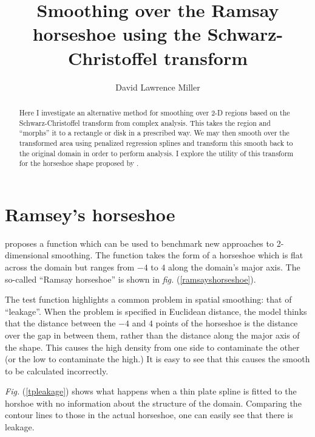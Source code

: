 \documentclass[a4paper,10pt]{amsart}
\title{Smoothing over the Ramsay horseshoe using the Schwarz-Christoffel transform}
\author{David Lawrence Miller}
\newcommand{\fig}[1]{\emph{fig.} (\ref{#1})}
\newcommand{\Fig}[1]{\emph{Fig.} (\ref{#1})}
\begin{document}
\begin{abstract}
Here I investigate an alternative method for smoothing over 2-D regions based on the Schwarz-Christoffel transform from complex analysis. This takes the region and ``morphs'' it to a rectangle or disk in a prescribed way. We may then smooth over the transformed area using penalized regression splines and transform this smooth back to the original domain in order to perform analysis. I explore the utility of this transform for the horseshoe shape proposed by \cite{ramsay}.
\end{abstract}


\newtheorem{thm}{Theorem}[section]

\newtheorem{defn}{Definition}[section]

\maketitle



\section{Ramsey's horseshoe}

\cite{ramsay} proposes a function which can be used to benchmark new approaches to 2-dimensional smoothing. The function takes the form of a horseshoe which is flat across the domain but ranges from $-4$ to $4$ along the domain's major axis. The so-called ``Ramsay horseshoe'' is shown in \fig{ramsayshorseshoe}.

The test function highlights a common problem in spatial smoothing: that of ``leakage''. When the problem is specified in Euclidean distance, the model thinks that the distance between the $-4$ and $4$ points of the horseshoe is the distance over the gap in between them, rather than the distance along the major axis of the shape. This causes the high density from one side to contaminate the other (or the low to contaminate the high.) It is easy to see that this causes the smooth to be calculated incorrectly.

\Fig{tpleakage} shows what happens when a thin plate spline is fitted to the horshoe with no information about the structure of the domain. Comparing the contour lines to those in the actual horseshoe, one can easily see that there is leakage.
\end{document}
